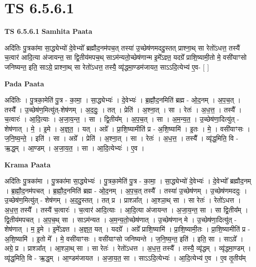 \documentclass[17pt]{extarticle}
\begin{document}
\section{ TS 6.5.6.1 }

\textbf{TS 6.5.6.1 } \newline
\textbf{Samhita Paata} \newline

अदि॑तिः पु॒त्रका॑मा सा॒द्ध्येभ्यो॑ दे॒वेभ्यो᳚ ब्रह्मौद॒नम॑पच॒त् तस्या॑ उ॒च्छेष॑णमददु॒स्तत् प्राश्ना॒थ् सा रेतो॑ऽधत्त॒ तस्यै॑ च॒त्वार॑ आदि॒त्या अ॑जायन्त॒ सा द्वि॒तीय॑मपच॒थ् साऽम॑न्यतो॒च्छेष॑णान्म इ॒मे᳚ऽज्ञ्त॒ यदग्रे᳚ प्राशि॒ष्यामी॒तो मे॒ वसी॑याꣳसो जनिष्यन्त॒ इति॒ साऽग्रे॒ प्राश्ना॒थ् सा रेतो॑ऽधत्त॒ तस्यै॒ व्यृ॑द्धमा॒ण्डम॑जायत॒ साऽऽदि॒त्येभ्य॑ ए॒व- [  ] \newline

\textbf{Pada Paata} \newline

अदि॑तिः । पु॒त्रका॒मेति॑ पु॒त्र - का॒मा॒ । सा॒द्ध्येभ्यः॑ । दे॒वेभ्यः॑ । ब्र॒ह्मौ॒द॒नमिति॑ ब्रह्म - ओ॒द॒नम् । अ॒प॒च॒त् । तस्यै᳚ । उ॒च्छेष॑ण॒मित्यु॑त्-शेष॑णम् । अ॒द॒दुः॒ । तत् । प्रेति॑ । अ॒श्ना॒त् । सा । रेतः॑ । अ॒ध॒त्त॒ । तस्यै᳚ । च॒त्वारः॑ । आ॒दि॒त्याः । अ॒जा॒य॒न्त॒ । सा । द्वि॒तीय᳚म् । अ॒प॒च॒त् । सा । अ॒म॒न्य॒त॒ । उ॒च्छेष॑णा॒दित्यु॑त् - शेष॑णात् । मे॒ । इ॒मे । अ॒ज्ञ्॒त॒ । यत् । अग्रे᳚ । प्रा॒शि॒ष्यामीति॑ प्र - अ॒शि॒ष्यामि॑ । इ॒तः । मे॒ । वसी॑याꣳसः । ज॒नि॒ष्य॒न्ते॒ । इति॑ । सा । अग्रे᳚ । प्रेति॑ । अ॒श्ना॒त् । सा । रेतः॑ । अ॒ध॒त्त॒ । तस्यै᳚ । व्यृ॑द्ध॒मिति॒ वि - ऋ॒द्ध॒म् । आ॒ण्डम् । अ॒जा॒य॒त॒ । सा । आ॒दि॒त्येभ्यः॑ । ए॒व ।  \newline


\textbf{Krama Paata} \newline

अदि॑तिः पु॒त्रका॑मा । पु॒त्रका॑मा सा॒द्ध्येभ्यः॑ । पु॒त्रका॒मेति॑ पु॒त्र - का॒मा॒ । सा॒द्ध्येभ्यो॑ दे॒वेभ्यः॑ । दे॒वेभ्यो᳚ ब्रह्मौद॒नम् । ब्र॒ह्मौ॒द॒नम॑पचत् । ब्र॒ह्मौ॒द॒नमिति॑ ब्रह्म - ओ॒द॒नम् । अ॒प॒च॒त् तस्यै᳚ । तस्या॑ उ॒च्छेष॑णम् । उ॒च्छेष॑णमददुः । उ॒च्छेष॑ण॒मित्यु॑त् - शेष॑णम् । अ॒द॒दु॒स्तत् । तत् प्र । प्राश्ञा᳚त् । आ॒श्ञा॒थ् सा । सा रेतः॑ । रेतो॑ऽधत्त । अ॒ध॒त्त॒ तस्यै᳚ । तस्यै॑ च॒त्वारः॑ । च॒त्वार॑ आदि॒त्याः । आ॒दि॒त्या अ॑जायन्त । अ॒जा॒य॒न्त॒ सा । सा द्वि॒तीय᳚म् । द्वि॒तीय॑मपचत् । अ॒प॒च॒थ् सा । साऽम॑न्यत । अ॒म॒न्य॒तो॒च्छेष॑णात् । उ॒च्छेष॑णान् मे । उ॒च्छेष॑णा॒दित्यु॑त् - शेष॑णात् । म॒ इ॒मे । इ॒मे᳚ऽज्ञ्त । अ॒ज्ञ्॒त॒ यत् । यदग्रे᳚ । अग्रे᳚ प्राशि॒ष्यामि॑ । प्रा॒शि॒ष्यामी॒तः । प्रा॒शि॒ष्यामीति॑ प्र - अ॒शि॒ष्यामि॑ । इ॒तो मे᳚ । मे॒ वसी॑याꣳसः । वसी॑याꣳसो जनिष्यन्ते । ज॒नि॒ष्य॒न्त॒ इति॑ । इति॒ सा । साऽग्रे᳚ । अग्रे॒ प्र । प्राश्ञा᳚त् । आ॒श्ञा॒थ् सा । सा रेतः॑ । रेतो॑ऽधत्त । अ॒ध॒त्त॒ तस्यै᳚ । तस्यै॒ व्यृ॑द्धम् । व्यृ॑द्धमा॒ण्डम् । व्यृ॑द्ध॒मिति॒ वि - ऋ॒द्ध॒म् । आ॒ण्डम॑जायत । अ॒जा॒य॒त॒ सा । साऽऽदि॒त्येभ्यः॑ । आ॒दि॒त्येभ्य॑ ए॒व । ए॒व तृ॒तीय᳚म् \newline
\end{document}
